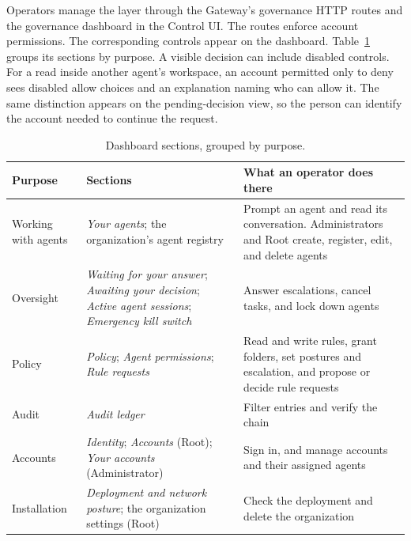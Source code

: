 {\color{red}Operators manage the layer through the Gateway's governance HTTP
routes and the governance dashboard in the Control UI. The routes enforce
account permissions. The corresponding controls appear on the dashboard.
Table~\ref{tab:gov-dashboard-sections} groups its sections by purpose.
A visible decision can include disabled controls. For a read inside another
agent's workspace, an account permitted only to deny sees disabled allow
choices and an explanation naming who can allow it. The same distinction
appears on the pending-decision view, so the person can identify the account
needed to continue the request.}

\begin{table}[htbp]
\centering
\caption{Dashboard sections, grouped by purpose.}
\label{tab:gov-dashboard-sections}
\small
\begin{tabular}{@{}>{\raggedright\arraybackslash}p{}>{\raggedright\arraybackslash}p{}>{\raggedright\arraybackslash}p{}@{}}
\toprule
\textbf{Purpose} & \textbf{Sections} & \textbf{What an operator does
there} \\
\midrule
Working with agents & \textit{Your agents}; the organization's agent
registry & Prompt an agent and read its conversation. Administrators and
Root create, register, edit, and delete agents \\
Oversight & \textit{Waiting for your answer}; \textit{Awaiting your
decision}; \textit{Active agent sessions}; \textit{Emergency kill switch} &
Answer escalations, cancel tasks, and lock down agents \\
Policy & \textit{Policy}; \textit{Agent permissions}; \textit{Rule
requests} & Read and write rules, grant folders, set postures and
escalation, and propose or decide rule requests \\
Audit & \textit{Audit ledger} & Filter entries and verify the chain \\
Accounts & \textit{Identity}; \textit{Accounts} (Root); \textit{Your
accounts} (Administrator) & Sign in, and manage accounts and their
assigned agents \\
Installation & \textit{Deployment and network posture}; the organization
settings (Root) & Check the deployment and delete the organization \\
\bottomrule
\end{tabular}
\end{table}

